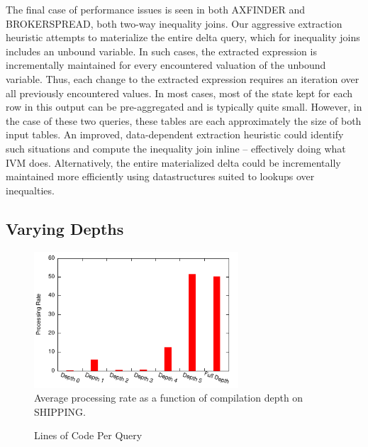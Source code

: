 The final case of performance issues is seen in both AXFINDER and BROKERSPREAD, both two-way inequality joins.  Our aggressive extraction heuristic attempts to materialize the entire delta query, which for inequality joins includes an unbound variable.  In such cases, the extracted expression is incrementally maintained for every encountered valuation of the unbound variable.  Thus, each change to the extracted expression requires an iteration over all previously encountered values.  In most cases, most of the state kept for each row in this output can be pre-aggregated and is typically quite small.  However, in the case of these two queries, these tables are each approximately the size of both input tables.  An improved, data-dependent extraction heuristic could identify such situations and compute the inequality join inline -- effectively doing what IVM does.  Alternatively, the entire materialized delta could be incrementally maintained more efficiently using datastructures\cite{range trees} suited to lookups over inequalties.


\subsection{Varying Depths}
\begin{figure}
\begin{center}
\includegraphics[width=3in]{../graphs/graphs/depth_ssb4.pdf}
\caption{Average processing rate as a function of compilation depth on SHIPPING.}
\label{fig:experiments:ssb4depth}
\end{center}
\end{figure}


\begin{figure}
\begin{center}

\caption{Lines of Code Per Query}
\label{fig:experiments:loc}
\end{center}
\end{figure}